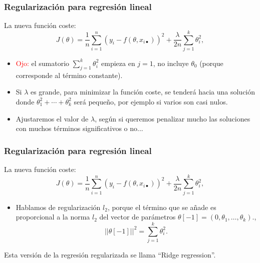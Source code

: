 \documentclass{beamer}
\begin{document}
 \begin{frame}\frametitle{Regularización para regresión lineal}
   \begin{overlayarea}{\textwidth}{8cm} 
      La nueva función coste: 
 $$J(\theta)=\frac 1 n\sum_{i=1}^n\left(y_i-f(\theta,x_{i\bullet})\right)^2 + \frac \lambda {2n} \sum_{j=1}^{k}\theta_i^2, $$

 \begin{itemize}
 \item<2-> \textcolor{red}{Ojo:} el sumatorio $\sum_{j=1}^{k}\theta_i^2$ empieza en $j=1$, no incluye $\theta_0$ (porque corresponde al término constante).
 \item<3-> Si $\lambda$ es grande, para minimizar la función coste, se tenderá hacia una solución donde $\theta_1^2+\cdots+\theta_k^2$ será pequeño, por ejemplo si varios son casi nulos.
 \item<4-> Ajustaremos el valor de $\lambda$, según si queremos penalizar mucho las soluciones con muchos términos significativos o no...
 \end{itemize}

   \end{overlayarea}
   
 \end{frame}

 \begin{frame}\frametitle{Regularización para regresión lineal}
   \begin{overlayarea}{\textwidth}{8cm} 
      La nueva función coste: 
 $$J(\theta)=\frac 1 n\sum_{i=1}^n\left(y_i-f(\theta,x_{i\bullet})\right)^2 +\frac \lambda {2n} \sum_{j=1}^{k}\theta_i^2, $$

 \begin{itemize}
 \item Hablamos de regularización $l_2$, porque el término que se
   añade es proporcional a la norma $l_2$ del vector de parámetros
   $\theta[-1]=(0,\theta_1,\ldots,\theta_k).$,
   $$\lvert\lvert \theta[-1]\rvert\rvert^2 = \sum_{j=1}^{k}\theta_i^2.$$
 \end{itemize}\vspace{-0.5cm}
 \begin{block}{}
   Esta versión de la regresión regularizada se llama \alert{``Ridge
   regression''}.
 \end{block}

   \end{overlayarea}
   
 \end{frame}
\end{document}
